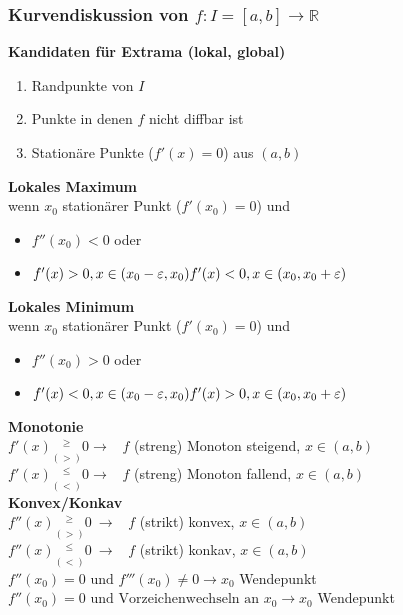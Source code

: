 \documentclass[german]{latex4ei/latex4ei_sheet}
\begin{document}
\begin{sectionbox}
    \subsubsection{Kurvendiskussion von $f: I = [a, b] \rightarrow \mathbb{R}$}
    \textbf{Kandidaten für Extrama (lokal, global)}
    \begin{enumerate}\itemsep0pt
    \item Randpunkte von $I$
    \item Punkte in denen $f$ nicht diffbar ist
    \item Stationäre Punkte ($f'(x)=0$) aus $(a,b)$
    \end{enumerate}
    \textbf{Lokales Maximum} \\
    wenn $x_0$ stationärer Punkt ($f'(x_0) = 0$) und
    \begin{itemize}\itemsep0pt
    \item
    $f''(x_0)<0$ oder
    \item
    $f'(x) > 0, x \in (x_0-\varepsilon, x_0) \\
     f'(x) < 0, x \in (x_0, x_0+\varepsilon)$
    \end{itemize}
    \textbf{Lokales Minimum} \\
    wenn $x_0$ stationärer Punkt ($f'(x_0) = 0$) und
    \begin{itemize}\itemsep0pt
    \item
    $f''(x_0)>0$ oder
    \item
    $f'(x) < 0, x \in (x_0-\varepsilon, x_0) \\
     f'(x) > 0, x \in (x_0, x_0+\varepsilon)$
    \end{itemize}
    \textbf{Monotonie} \\
    $f'(x) \underset{(>)}{^{\ge}} 0 \rightarrow$ \ $f$ (streng) Monoton steigend, $x\in(a,b)$\\
    $f'(x) \underset{(<)}{^{\le}} 0 \rightarrow$ \ $f$ (streng) Monoton fallend, $x\in(a,b)$\\
    \textbf{Konvex/Konkav} \\
    $f''(x) \underset{(>)}{^{\ge}} 0 \ \rightarrow$ \ $f$ (strikt) konvex, $x\in(a,b)$\\
    $f''(x) \underset{(<)}{^{\le}} 0 \ \rightarrow$ \ $f$ (strikt) konkav, $x\in(a,b)$\\
    $f''(x_0)=0 \text{ und } f'''(x_0) \ne 0 \rightarrow x_0$ Wendepunkt \\
    $f''(x_0)=0 \text{ und Vorzeichenwechseln an } x_0 \rightarrow x_0$ Wendepunkt \\

\end{sectionbox}
\end{document}
